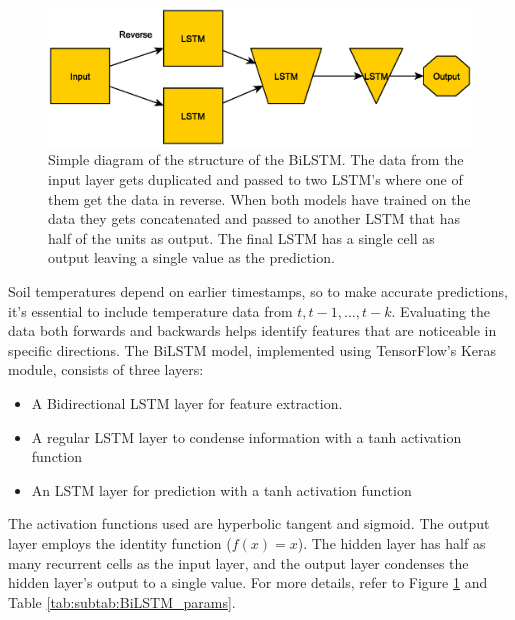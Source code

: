 \begin{figure}[H]
	\centering
	\includegraphics[width=0.7\linewidth]{figures/BiLSTM}
	\caption[modified BiLSTM overview]{Simple diagram of the structure of the BiLSTM. The data from the input layer gets duplicated and passed to two LSTM's where one of them get the data in reverse. When both models have trained on the data they gets concatenated and passed to another LSTM that has half of the units as output. The final LSTM has a single cell as output leaving a single value as the prediction.}
	\label{fig:bilstm}
\end{figure}

Soil temperatures depend on earlier timestamps, so to make accurate predictions, it's essential to include temperature data from $t, t-1, \dots, t-k$. Evaluating the data both forwards and backwards helps identify features that are noticeable in specific directions. The BiLSTM model, implemented using TensorFlow's Keras module, consists of three layers:

\begin{itemize}
	\item A Bidirectional LSTM layer for feature extraction.
	\item A regular LSTM layer to condense information with a tanh activation function
	\item An LSTM layer for prediction with a tanh activation function
\end{itemize}

The activation functions used are hyperbolic tangent and sigmoid. The output layer employs the identity function ($f(x) = x$). The hidden layer has half as many recurrent cells as the input layer, and the output layer condenses the hidden layer's output to a single value. For more details, refer to Figure \ref{fig:bilstm} and Table \ref{tab:subtab:BiLSTM_params}.

